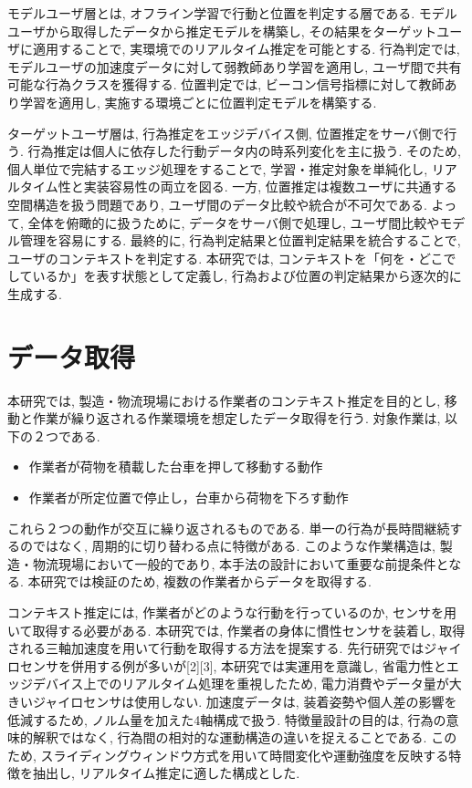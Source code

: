 \documentclass[a4paper,12pt]{jreport}
\begin{document}
モデルユーザ層とは, オフライン学習で行動と位置を判定する層である. モデルユーザから取得したデータから推定モデルを構築し, その結果をターゲットユーザに適用することで, 実環境でのリアルタイム推定を可能とする. 行為判定では, モデルユーザの加速度データに対して弱教師あり学習を適用し, ユーザ間で共有可能な行為クラスを獲得する. 位置判定では, ビーコン信号指標に対して教師あり学習を適用し, 実施する環境ごとに位置判定モデルを構築する. 

ターゲットユーザ層は, 行為推定をエッジデバイス側, 位置推定をサーバ側で行う. 行為推定は個人に依存した行動データ内の時系列変化を主に扱う. そのため, 個人単位で完結するエッジ処理をすることで, 学習・推定対象を単純化し, リアルタイム性と実装容易性の両立を図る. 一方, 位置推定は複数ユーザに共通する空間構造を扱う問題であり, ユーザ間のデータ比較や統合が不可欠である. よって, 全体を俯瞰的に扱うために, データをサーバ側で処理し, ユーザ間比較やモデル管理を容易にする. 最終的に, 行為判定結果と位置判定結果を統合することで, ユーザのコンテキストを判定する. 本研究では, コンテキストを「何を・どこでしているか」を表す状態として定義し, 行為および位置の判定結果から逐次的に生成する. 



\section{データ取得}

本研究では, 製造・物流現場における作業者のコンテキスト推定を目的とし, 移動と作業が繰り返される作業環境を想定したデータ取得を行う. 対象作業は, 以下の２つである. 
\begin{itemize}
  \item 作業者が荷物を積載した台車を押して移動する動作
  \item 作業者が所定位置で停止し，台車から荷物を下ろす動作
\end{itemize}

これら２つの動作が交互に繰り返されるものである. 単一の行為が長時間継続するのではなく, 周期的に切り替わる点に特徴がある. このような作業構造は, 製造・物流現場において一般的であり, 本手法の設計において重要な前提条件となる. 本研究では検証のため, 複数の作業者からデータを取得する. 

コンテキスト推定には, 作業者がどのような行動を行っているのか, センサを用いて取得する必要がある. 本研究では, 作業者の身体に慣性センサを装着し, 取得される三軸加速度を用いて行動を取得する方法を提案する. 先行研究ではジャイロセンサを併用する例が多いが[2][3], 本研究では実運用を意識し, 省電力性とエッジデバイス上でのリアルタイム処理を重視したため, 電力消費やデータ量が大きいジャイロセンサは使用しない. 加速度データは, 装着姿勢や個人差の影響を低減するため, ノルム量を加えた4軸構成で扱う. 特徴量設計の目的は, 行為の意味的解釈ではなく, 行為間の相対的な運動構造の違いを捉えることである. このため, スライディングウィンドウ方式を用いて時間変化や運動強度を反映する特徴を抽出し, リアルタイム推定に適した構成とした. 
\end{document}
